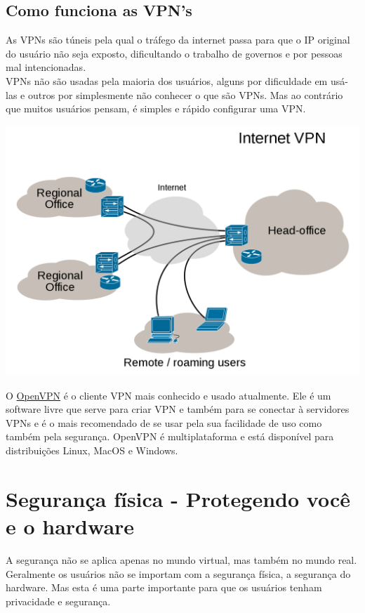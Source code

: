 \documentclass[12pt, letterpaper, Monospace:12]{report}
\begin{document}
\subsection{Como funciona as VPN's}
	As VPNs são túneis pela qual o tráfego da internet passa para que o IP original do usuário não seja exposto, dificultando o trabalho de governos e por pessoas mal intencionadas.\\

	VPNs não são usadas pela maioria dos usuários, alguns por dificuldade em usá-las e outros por simplesmente não conhecer o que são VPNs. Mas ao contrário que muitos usuários pensam, é simples e rápido configurar uma VPN.

\begin{center}
	\includegraphics[scale=0.44]{vpn.png}
\end{center}


O \href{https://openvpn.org/}{OpenVPN} é o cliente VPN mais conhecido e usado atualmente. Ele é um software livre que serve para criar VPN e também para se conectar à servidores VPNs e é o mais recomendado de se usar pela sua facilidade de uso como também pela segurança. OpenVPN é multiplataforma e está disponível para distribuições Linux, MacOS e Windows.

\pagebreak

\section{Segurança física - Protegendo você e o hardware}
	A segurança não se aplica apenas no mundo virtual, mas também no mundo real. Geralmente os usuários não se importam com a segurança física, a segurança do hardware. Mas esta é uma parte importante para que os usuários tenham privacidade e segurança.\\
\end{document}
